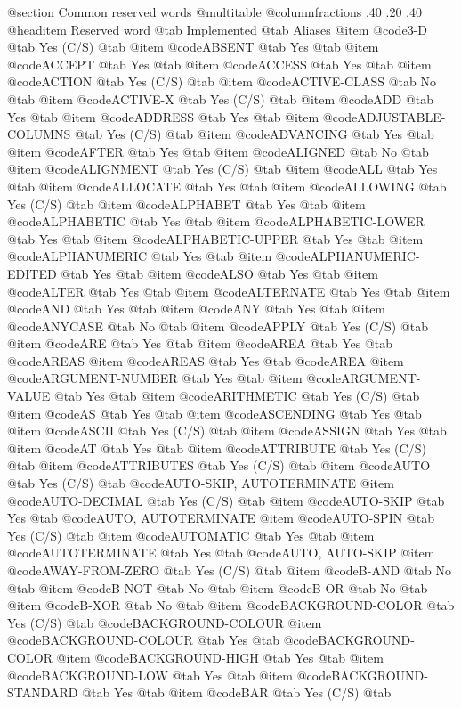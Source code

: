@section Common reserved words
@multitable @columnfractions .40 .20 .40
@headitem Reserved word @tab Implemented @tab Aliases
@item @code{3-D} @tab Yes	(C/S) @tab 
@item @code{ABSENT} @tab Yes @tab 
@item @code{ACCEPT} @tab Yes @tab 
@item @code{ACCESS} @tab Yes @tab 
@item @code{ACTION} @tab Yes	(C/S) @tab 
@item @code{ACTIVE-CLASS} @tab No @tab 
@item @code{ACTIVE-X} @tab Yes	(C/S) @tab 
@item @code{ADD} @tab Yes @tab 
@item @code{ADDRESS} @tab Yes @tab 
@item @code{ADJUSTABLE-COLUMNS} @tab Yes	(C/S) @tab 
@item @code{ADVANCING} @tab Yes @tab 
@item @code{AFTER} @tab Yes @tab 
@item @code{ALIGNED} @tab No @tab 
@item @code{ALIGNMENT} @tab Yes	(C/S) @tab 
@item @code{ALL} @tab Yes @tab 
@item @code{ALLOCATE} @tab Yes @tab 
@item @code{ALLOWING} @tab Yes	(C/S) @tab 
@item @code{ALPHABET} @tab Yes @tab 
@item @code{ALPHABETIC} @tab Yes @tab 
@item @code{ALPHABETIC-LOWER} @tab Yes @tab 
@item @code{ALPHABETIC-UPPER} @tab Yes @tab 
@item @code{ALPHANUMERIC} @tab Yes @tab 
@item @code{ALPHANUMERIC-EDITED} @tab Yes @tab 
@item @code{ALSO} @tab Yes @tab 
@item @code{ALTER} @tab Yes @tab 
@item @code{ALTERNATE} @tab Yes @tab 
@item @code{AND} @tab Yes @tab 
@item @code{ANY} @tab Yes @tab 
@item @code{ANYCASE} @tab No @tab 
@item @code{APPLY} @tab Yes	(C/S) @tab 
@item @code{ARE} @tab Yes @tab 
@item @code{AREA} @tab Yes @tab @code{AREAS}
@item @code{AREAS} @tab Yes @tab @code{AREA}
@item @code{ARGUMENT-NUMBER} @tab Yes @tab 
@item @code{ARGUMENT-VALUE} @tab Yes @tab 
@item @code{ARITHMETIC} @tab Yes	(C/S) @tab 
@item @code{AS} @tab Yes @tab 
@item @code{ASCENDING} @tab Yes @tab 
@item @code{ASCII} @tab Yes	(C/S) @tab 
@item @code{ASSIGN} @tab Yes @tab 
@item @code{AT} @tab Yes @tab 
@item @code{ATTRIBUTE} @tab Yes	(C/S) @tab 
@item @code{ATTRIBUTES} @tab Yes	(C/S) @tab 
@item @code{AUTO} @tab Yes	(C/S) @tab @code{AUTO-SKIP, AUTOTERMINATE}
@item @code{AUTO-DECIMAL} @tab Yes	(C/S) @tab 
@item @code{AUTO-SKIP} @tab Yes @tab @code{AUTO, AUTOTERMINATE}
@item @code{AUTO-SPIN} @tab Yes	(C/S) @tab 
@item @code{AUTOMATIC} @tab Yes @tab 
@item @code{AUTOTERMINATE} @tab Yes @tab @code{AUTO, AUTO-SKIP}
@item @code{AWAY-FROM-ZERO} @tab Yes	(C/S) @tab 
@item @code{B-AND} @tab No @tab 
@item @code{B-NOT} @tab No @tab 
@item @code{B-OR} @tab No @tab 
@item @code{B-XOR} @tab No @tab 
@item @code{BACKGROUND-COLOR} @tab Yes	(C/S) @tab @code{BACKGROUND-COLOUR}
@item @code{BACKGROUND-COLOUR} @tab Yes @tab @code{BACKGROUND-COLOR}
@item @code{BACKGROUND-HIGH} @tab Yes @tab 
@item @code{BACKGROUND-LOW} @tab Yes @tab 
@item @code{BACKGROUND-STANDARD} @tab Yes @tab 
@item @code{BAR} @tab Yes	(C/S) @tab 
